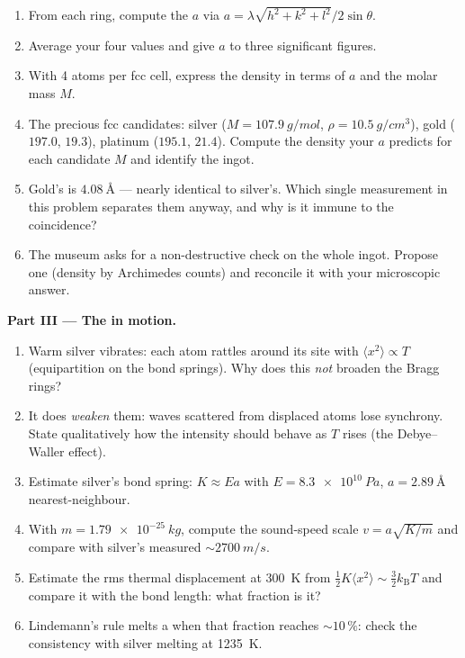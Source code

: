 \begin{problem}
\begin{enumerate}[resume]
  \item From each ring, compute the  $a$ via
        $a = \lambda\sqrt{h^2+k^2+l^2}/2\sin\theta$.
  \item Average your four values and give $a$ to three
        significant figures.
  \item With 4 atoms per fcc cell, express the density in terms
        of $a$ and the molar mass $M$.
  \item The precious fcc candidates: silver
        ($M = \qty{107.9}{g/mol}$, $\rho = \qty{10.5}{g/cm^3}$),
        gold ($197.0$, $19.3$), platinum ($195.1$, $21.4$).
        Compute the density your $a$ predicts for each candidate
        $M$ and identify the ingot.
  \item Gold's  is $\qty{4.08}{\angstrom}$ ---
        nearly identical to silver's. Which single measurement in
        this problem separates them anyway, and why is it immune
        to the coincidence?
  \item The museum asks for a non-destructive check on the whole
        ingot. Propose one (density by Archimedes counts) and
        reconcile it with your microscopic answer.
\end{enumerate}

\medskip\noindent\textbf{Part III --- The  in motion.}

\begin{enumerate}[resume]
  \item Warm silver vibrates: each atom rattles around its site
        with $\langle x^2\rangle \propto T$ (equipartition on the
        bond springs). Why does this \emph{not} broaden the Bragg
        rings?
  \item It does \emph{weaken} them: waves scattered from displaced
        atoms lose synchrony. State qualitatively how the
        intensity should behave as $T$ rises (the Debye--Waller
        effect).
  \item Estimate silver's bond spring: $K \approx Ea$ with
        $E = \qty{8.3e10}{Pa}$, $a = \qty{2.89}{\angstrom}$
        nearest-neighbour.
  \item With $m = \qty{1.79e-25}{kg}$, compute the sound-speed
        scale $v = a\sqrt{K/m}$ and compare with silver's measured
        $\sim\qty{2700}{m/s}$.
  \item Estimate the rms thermal displacement at \qty{300}{K}
        from $\tfrac12K\langle x^2\rangle \sim
        \tfrac32k_{\text{B}}T$ and compare it with the bond
        length: what fraction is it?
  \item Lindemann's rule melts a  when that fraction
        reaches $\sim10\,\%$: check the consistency with silver
        melting at \qty{1235}{K}.
\end{enumerate}


\end{problem}
